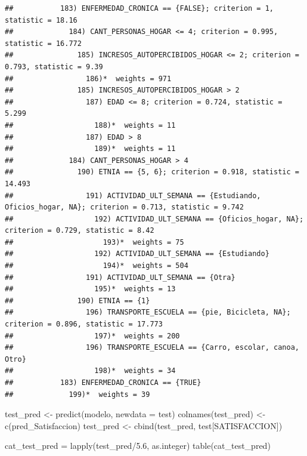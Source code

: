 \documentclass[
]{article}
\newenvironment{Shaded}{\begin{snugshade}}{\end{snugshade}}
\newcommand{\AttributeTok}[1]{\textcolor[rgb]{0.77,0.63,0.00}{#1}}
\newcommand{\FloatTok}[1]{\textcolor[rgb]{0.00,0.00,0.81}{#1}}
\newcommand{\FunctionTok}[1]{\textcolor[rgb]{0.00,0.00,0.00}{#1}}
\newcommand{\NormalTok}[1]{#1}
\newcommand{\OtherTok}[1]{\textcolor[rgb]{0.56,0.35,0.01}{#1}}
\newcommand{\SpecialCharTok}[1]{\textcolor[rgb]{0.00,0.00,0.00}{#1}}
\newcommand{\StringTok}[1]{\textcolor[rgb]{0.31,0.60,0.02}{#1}}
\begin{document}
\begin{verbatim}
##           183) ENFERMEDAD_CRONICA == {FALSE}; criterion = 1, statistic = 18.16
##             184) CANT_PERSONAS_HOGAR <= 4; criterion = 0.995, statistic = 16.772
##               185) INCRESOS_AUTOPERCIBIDOS_HOGAR <= 2; criterion = 0.793, statistic = 9.39
##                 186)*  weights = 971 
##               185) INCRESOS_AUTOPERCIBIDOS_HOGAR > 2
##                 187) EDAD <= 8; criterion = 0.724, statistic = 5.299
##                   188)*  weights = 11 
##                 187) EDAD > 8
##                   189)*  weights = 11 
##             184) CANT_PERSONAS_HOGAR > 4
##               190) ETNIA == {5, 6}; criterion = 0.918, statistic = 14.493
##                 191) ACTIVIDAD_ULT_SEMANA == {Estudiando, Oficios_hogar, NA}; criterion = 0.713, statistic = 9.742
##                   192) ACTIVIDAD_ULT_SEMANA == {Oficios_hogar, NA}; criterion = 0.729, statistic = 8.42
##                     193)*  weights = 75 
##                   192) ACTIVIDAD_ULT_SEMANA == {Estudiando}
##                     194)*  weights = 504 
##                 191) ACTIVIDAD_ULT_SEMANA == {Otra}
##                   195)*  weights = 13 
##               190) ETNIA == {1}
##                 196) TRANSPORTE_ESCUELA == {pie, Bicicleta, NA}; criterion = 0.896, statistic = 17.773
##                   197)*  weights = 200 
##                 196) TRANSPORTE_ESCUELA == {Carro, escolar, canoa, Otro}
##                   198)*  weights = 34 
##           183) ENFERMEDAD_CRONICA == {TRUE}
##             199)*  weights = 39
\end{verbatim}

\begin{Shaded}
\begin{Highlighting}[]
\NormalTok{test\_pred }\OtherTok{\textless{}{-}} \FunctionTok{predict}\NormalTok{(modelo, }\AttributeTok{newdata =}\NormalTok{ test)}
\FunctionTok{colnames}\NormalTok{(test\_pred) }\OtherTok{\textless{}{-}} \FunctionTok{c}\NormalTok{(}\StringTok{\textquotesingle{}pred\_Satisfaccion\textquotesingle{}}\NormalTok{)}
\NormalTok{test\_pred }\OtherTok{\textless{}{-}} \FunctionTok{cbind}\NormalTok{(test\_pred, test[}\StringTok{\textquotesingle{}SATISFACCION\textquotesingle{}}\NormalTok{])}

\NormalTok{cat\_test\_pred }\OtherTok{=} \FunctionTok{lapply}\NormalTok{(test\_pred}\SpecialCharTok{/}\FloatTok{5.6}\NormalTok{, as.integer)}
\FunctionTok{table}\NormalTok{(cat\_test\_pred)}
\end{Highlighting}
\end{Shaded}
\end{document}
